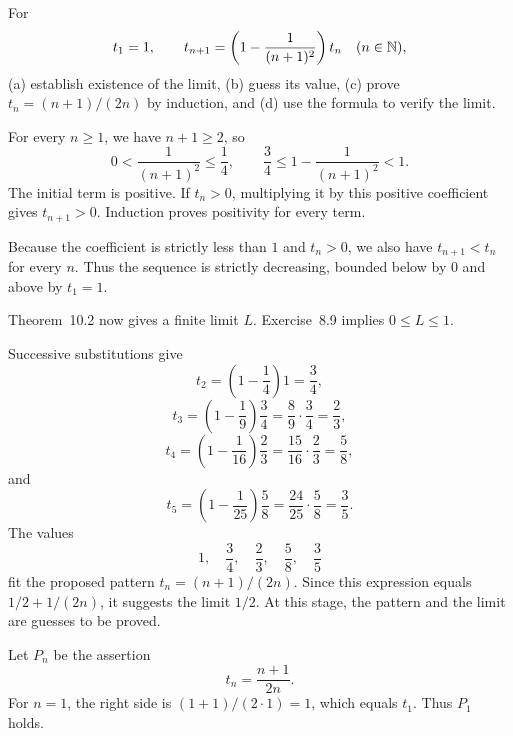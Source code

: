 

\goal For
\[
 t_1=1,\qquad
 t_{n+1}=\left(1-\frac1{(n+1)^2}\right)t_n\quad(n\in\mathbb{N}),
\]
(a) establish existence of the limit, (b) guess its value,
(c) prove $t_n=(n+1)/(2n)$ by induction, and (d) use the formula
to verify the limit.

For every $n\ge1$, we have $n+1\ge2$, so
\[
 0<\frac1{(n+1)^2}\le\frac14,\qquad
 \frac34\le1-\frac1{(n+1)^2}<1.
\]
The initial term is positive. If $t_n>0$, multiplying it by this
positive coefficient gives $t_{n+1}>0$. Induction proves positivity
for every term.

Because the coefficient is strictly less than $1$ and $t_n>0$,
we also have $t_{n+1}<t_n$ for every $n$. Thus the sequence is
strictly decreasing, bounded below by $0$ and above by $t_1=1$.

Theorem~10.2 now gives a finite limit $L$.
Exercise~8.9 implies $0\le L\le1$.


Successive substitutions give
\[
 t_2=\left(1-\frac14\right)1=\frac34,
\]
\[
 t_3=\left(1-\frac19\right)\frac34
     =\frac89\cdot\frac34=\frac23,
\]
\[
 t_4=\left(1-\frac1{16}\right)\frac23
     =\frac{15}{16}\cdot\frac23=\frac58,
\]
and
\[
 t_5=\left(1-\frac1{25}\right)\frac58
     =\frac{24}{25}\cdot\frac58=\frac35.
\]
The values
\[
 1,\quad \frac34,\quad \frac23,\quad \frac58,\quad \frac35
\]
fit the proposed pattern $t_n=(n+1)/(2n)$.
Since this expression equals $1/2+1/(2n)$, it suggests the limit $1/2$.
At this stage, the pattern and the limit are guesses to be proved.

Let $P_n$ be the assertion
\[
 t_n=\frac{n+1}{2n}.
\]
For $n=1$, the right side is $(1+1)/(2\cdot1)=1$, which equals $t_1$.
Thus $P_1$ holds.

